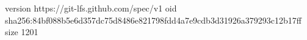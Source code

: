 version https://git-lfs.github.com/spec/v1
oid sha256:84bf088b5e6d357dc75d8486e821798fdd4a7e9cdb3d31926a379293c12b17ff
size 1201
